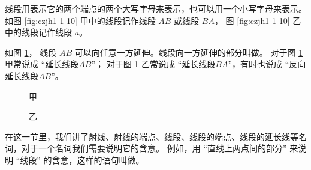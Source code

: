 线段用表示它的两个端点的两个大写字母来表示，也可以用一个小写字母来表示。
如图 \ref{fig:czjh1-1-10} 甲中的线段记作线段 $AB$ 或线段 $BA$，
图 \ref{fig:czjh1-1-10} 乙中的线段记作线段 $a$。

如图 \ref{fig:czjh1-1-11}， 线段 $AB$ 可以向任意一方延伸。线段向一方延伸的部分叫做。
对于图 \ref{fig:czjh1-1-11} 甲常说成 “延长线段$AB$”；
对于图 \ref{fig:czjh1-1-11} 乙常说成 “延长线段$BA$”，有时也说成 “反向延长线段$AB$”。

\begin{figure}[htbp]
    \centering
    \begin{minipage}[b]{6cm}
        \centering
        
        \caption*{甲}
    \end{minipage}
    \qquad
    \begin{minipage}[b]{6cm}
        \centering
        
        \caption*{乙}
    \end{minipage}
    \caption{}\label{fig:czjh1-1-11}
\end{figure}

在这一节里，我们讲了射线、射线的端点、线段、线段的端点、线段的延长线等名词，对于一个名词我们需要说明它的含意。
例如，用 “直线上两点间的部分” 来说明 “线段” 的含意，这样的语句叫做。


